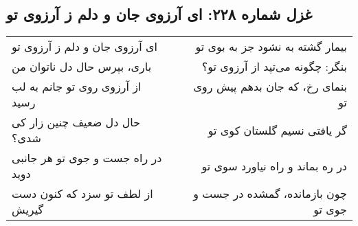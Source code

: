 \begin{center}
\section*{غزل شماره ۲۲۸: ای آرزوی جان و دلم ز آرزوی تو}
\label{sec:228}
\begin{longtable}{l p{0.5cm} r}
ای آرزوی جان و دلم ز آرزوی تو
&&
بیمار گشته به نشود جز به بوی تو
\\
باری، بپرس حال دل ناتوان من
&&
بنگر: چگونه می‌تپد از آرزوی تو؟
\\
از آرزوی روی تو جانم به لب رسید
&&
بنمای رخ، که جان بدهم پیش روی تو
\\
حال دل ضعیف چنین زار کی شدی؟
&&
گر یافتی نسیم گلستان کوی تو
\\
در راه جست و جوی تو هر جانبی دوید
&&
در ره بماند و راه نیاورد سوی تو
\\
از لطف تو سزد که کنون دست گیریش
&&
چون بازمانده، گمشده در جست و جوی تو
\\
\end{longtable}
\end{center}
